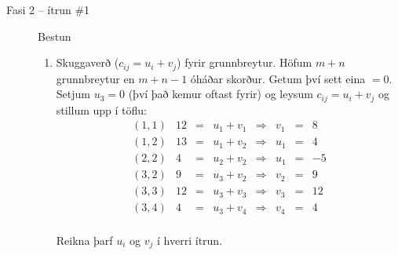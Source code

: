\begin{lausn}
\begin{description}
\newpage
\item[Fasi 2 -- ítrun \#1]Bestun
\begin{enumerate}
 \item Skuggaverð ($c_{ij}=u_i+v_j$) fyrir grunnbreytur. Höfum $m+n$ grunn\-breytur en $m+n-1$ óháðar skorður. Getum því sett eina $=0$.
Setjum $u_3=0$ (því það kemur oftast fyrir) og leysum $c_{ij}=u_i+v_j$ og stillum upp í töflu:
 \[ \begin{matrix}
  (1,1) & 12 &=& u_1+v_1 & \Rightarrow & v_1&=&8\\
  (1,2) & 13 &=& u_1+v_2 & \Rightarrow & u_1&=&4\\
  (2,2) &  4 &=& u_2+v_2 & \Rightarrow & u_1&=&-5\\
  (3,2) &  9 &=& u_3+v_2 & \Rightarrow & v_2&=&9\\
  (3,3) & 12 &=& u_3+v_3 & \Rightarrow & v_3&=&12\\
  (3,4) &  4 &=& u_3+v_4 & \Rightarrow & v_4&=&4\\
    \end{matrix}\]
\begin{aths}Reikna þarf $u_i$ og $v_j$ í hverri ítrun.\end{aths}


\end{enumerate}
\end{description}
\end{lausn}
